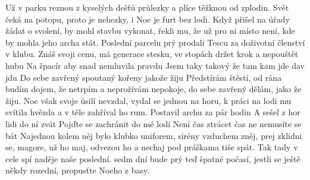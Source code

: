 \cho{}
Už v parku reznou z kyselých dešťů průlezky
a plíce těžknou od zplodin.
Svět čeká na potopu, proto je nehezky,
i Noe je furt bez lodi.
\ve{}
Když přišel na úřady žádat o svolení,
by mohl stavbu vykonat,
řekli mu, že už pro ni místo není,
kde by mohla jeho archa stát.
\ve{}
Poslední parcelu prý prodali Tescu
za doživotní členství v klubu.
Znáš svoji cenu, má generace stesku,
ve stopách držet krok
a nepouštět hubu
Na špacír aby snad nemluvila pravdu
Jsem taky takový že tam kam jde dav jdu
Do sebe zavřený spoutaný kořeny jakože žiju
\ve{}
Předstírám štěstí, od rána budím dojem,
že netrpím a neprožívám nepokoje,
do sebe zavřený dělám, jako že žiju.
\cho{}
Noe však svoje úsilí nevzdal,
vydal se jednou na horu,
k práci na lodi mu svítila hvězda
a v těle zahříval ho rum.
Postavil archu za pár hodin
A sešel z hor lidi do ní zvát
Pojďte se zachránit do mé lodi
Není čas ztrácet čas ne nemusíte se bát
\ve{}
Najednou kolem něj bylo klubko uniforem,
sirény vzduchem zněj, prej zklidni se, magore,
už ho maj, odvezou ho a nechaj
pod práškama tiše spát.
Tak tady v cele spí naděje naše poslední.
sedm dní bude prý teď špatné počasí,
jestli se ještě někdy rozední,
propusťte Noeho z basy.
\cho{}
\esong{}